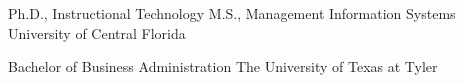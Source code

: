 


\begin{cventries}


\cventry
{Ph.D., Instructional Technology \newline {\vspace{-.75mm}}
M.S., Management Information Systems}  %
{University of Central Florida}
{} %
    {} %
{ %
}

\cventry
{Bachelor of Business Administration} %
{The University of Texas at Tyler}
{} %
    {} %
{ %
}


\end{cventries}
